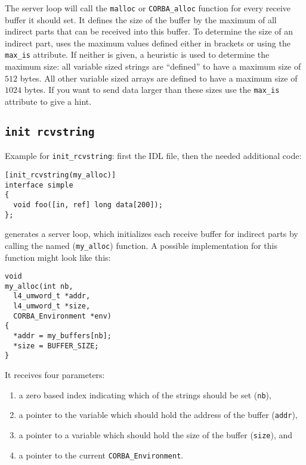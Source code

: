 The server loop will call the \verb|malloc| or \verb|CORBA_alloc| function for
every receive buffer it should set. It defines the size of the buffer by the
maximum of all indirect parts that can be received into this buffer.  To
determine the size of an indirect part, \dice{} uses the maximum values
defined either in brackets or using the \verb|max_is| attribute. If neither is
given, a heuristic is used to determine the maximum size: all variable sized
strings are ``defined'' to have a maximum size of $512$ bytes. All other
variable sized arrays are defined to have a maximum size of $1024$ bytes. If
you want to send data larger than these sizes use the \verb|max_is| attribute
to give \dice{} a hint.

\subsection{\tt init rcvstring}
Example for \verb|init_rcvstring|: first the IDL file, then the
needed additional code:
\begin{verbatim}
[init_rcvstring(my_alloc)]
interface simple
{
  void foo([in, ref] long data[200]);
};
\end{verbatim}

\dice{} generates a server loop, which initializes each receive
buffer for indirect parts by calling the named (\verb|my_alloc|)
function. A possible implementation for this function might look
like this:

\begin{verbatim}
void
my_alloc(int nb,
  l4_umword_t *addr,
  l4_umword_t *size,
  CORBA_Environment *env)
{
  *addr = my_buffers[nb];
  *size = BUFFER_SIZE;
}
\end{verbatim}

It receives four parameters:
\begin{enumerate}
\item a zero based index indicating which of the strings should
be set (\verb|nb|),
\item a pointer to the variable which should hold the address of the
buffer (\verb|addr|),
\item a pointer to a variable which should hold the size of the
buffer (\verb|size|), and
\item a pointer to the current \verb|CORBA_Environment|.
\end{enumerate}


